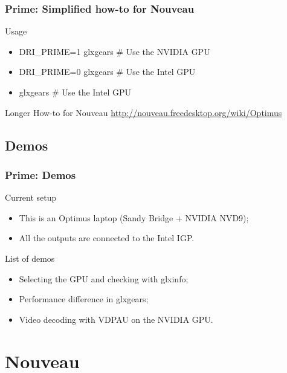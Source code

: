 \documentclass[11pt,english,compress]{beamer}
\begin{document}
\begin{frame}
	\frametitle{Prime: Simplified how-to for Nouveau}


	\begin{block}{Usage}
		\begin{itemize}
			\item DRI\_PRIME=1 glxgears \# Use the NVIDIA GPU
			\item DRI\_PRIME=0 glxgears \# Use the Intel GPU
			\item glxgears \# Use the Intel GPU
		\end{itemize}
	\end{block}

	\begin{block}{Longer How-to for Nouveau}
		\url{http://nouveau.freedesktop.org/wiki/Optimus} %
	\end{block}
\end{frame}


\subsection{Demos}
\begin{frame}
	\frametitle{Prime: Demos}

	\begin{block}{Current setup}
		\begin{itemize}
			\item This is an Optimus laptop (Sandy Bridge + NVIDIA NVD9);
			\item All the outputs are connected to the Intel IGP.
		\end{itemize}
	\end{block}

	\begin{block}{List of demos}
		\begin{itemize}
			\item Selecting the GPU and checking with glxinfo;
			\item Performance difference in glxgears;
			\item Video decoding with VDPAU on the NVIDIA GPU.
		\end{itemize}
	\end{block}
\end{frame}


\section{Nouveau}
\end{document}
